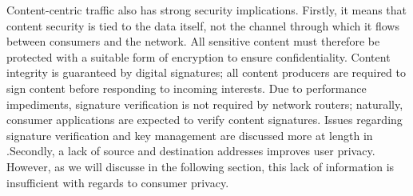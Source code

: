 Content-centric traffic also has strong security implications. Firstly, it means that content security is tied to the data itself, not the channel through which it flows between consumers and the network. All sensitive content must therefore be protected with a suitable form of encryption to ensure confidentiality. Content integrity is guaranteed by digital signatures; all content producers are required to sign content before responding to incoming interests. Due to performance impediments, signature verification is not required by network routers; naturally, consumer applications are expected to verify content signatures. Issues regarding signature verification and key management are discussed more at length in \cite{}.Secondly, a lack of source and destination addresses improves user privacy. However, as we will discusse in the following section, this lack of information is insufficient with regards to consumer privacy. 

